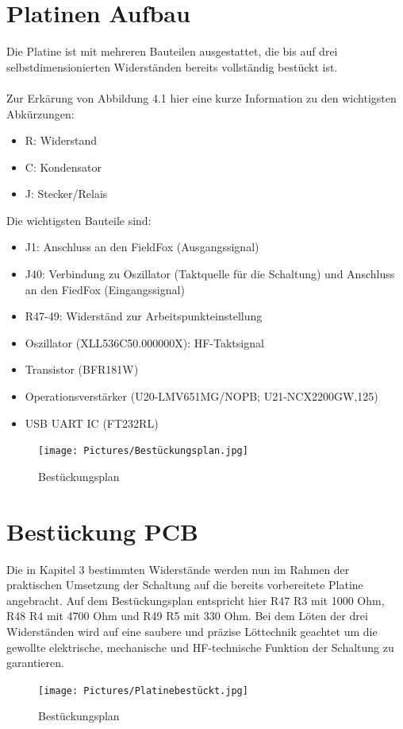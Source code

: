 
\section{Platinen Aufbau}
Die Platine ist mit mehreren Bauteilen ausgestattet, die bis auf drei selbstdimensionierten Widerständen
bereits vollständig bestückt ist. \\
\\
Zur Erkärung von Abbildung 4.1 hier eine kurze Information zu den wichtigsten Abkürzungen:
\begin{itemize}
    \item R: Widerstand
    \item C: Kondensator
    \item J: Stecker/Relais

    
\end{itemize}
Die wichtigsten Bauteile sind:
\begin{itemize}
    \item J1: Anschluss an den FieldFox (Ausgangssignal)
    \item J40: Verbindung zu Oszillator (Taktquelle für die Schaltung) und Anschluss an den FiedFox (Eingangssignal)
    \item R47-49: Widerständ zur Arbeitspunkteinstellung
    \item Oszillator (XLL536C50.000000X): HF-Taktsignal
    \item Transistor (BFR181W) 
    \item Operationsverstärker (U20-LMV651MG/NOPB; U21-NCX2200GW,125)
    \item USB UART IC (FT232RL)
\end{itemize}

\begin{figure}[h]
    \centering
    \texttt{[image: Pictures/Bestückungsplan.jpg]}
    \caption{Bestückungsplan}
\end{figure}



\section{Bestückung PCB}
Die in Kapitel 3 bestimmten Widerstände werden nun im Rahmen der praktischen Umsetzung der Schaltung auf die 
bereits vorbereitete Platine angebracht. Auf dem Bestückungsplan entspricht hier R47 R3 mit 1000 Ohm, R48 R4 mit 
4700 Ohm und R49 R5 mit 330 Ohm. Bei dem Löten der drei Widerständen wird auf eine saubere und präzise Löttechnik
geachtet um die gewollte elektrische, mechanische und HF-technische Funktion der Schaltung zu garantieren. 
\begin{figure}[h]
    \centering
    \texttt{[image: Pictures/Platinebestückt.jpg]}
    \caption{Bestückungsplan}
\end{figure}


